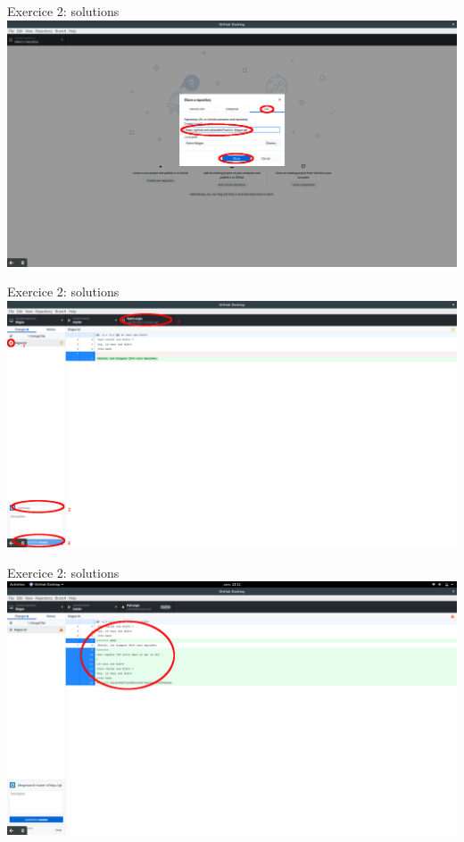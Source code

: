 \documentclass{beamer}
\begin{document}
\begin{frame}{Exercice 2: solutions}
    \centering
    \includegraphics[width=\textwidth]{img/image_exercices/cloning_with_url.png}
\end{frame}

\begin{frame}{Exercice 2: solutions}
    \centering
    \includegraphics[width=\textwidth]{img/image_exercices/fetch_for_merge.png}
\end{frame}

\begin{frame}{Exercice 2: solutions}
    \centering
    \includegraphics[width=\textwidth]{img/image_exercices/conflic_to_resolve.png}
\end{frame}
\end{document}
